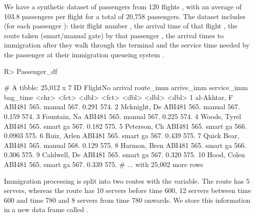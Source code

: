 \documentclass[article]{jss}
\begin{document}
We have a synthetic dataset of passengers  from 120 flights
, with an average of 103.8 passengers per flight for a
total of 20,758 passengers. The dataset includes (for each passenger
): their flight number , the arrival time of
that flight , the route taken (smart/manual gate) by that
passenger , the arrival times to immigration after
they walk through the terminal  and the service time
needed by the passenger at their immigration queueing system
.
%
\begin{CodeChunk}
\begin{Sinput}
R> Passenger_df
\end{Sinput}
\begin{Soutput}
# A tibble: 25,012 x 7
   ID            FlightNo arrival route_imm arrive_imm service_imm bag_time
   <chr>         <fct>      <dbl> <fct>          <dbl>       <dbl>    <dbl>
 1 al-Akhtar, F  ABI481      565. manual          567.      0.291      574.
 2 Mcknight, De  ABI481      565. manual          567.      0.159      574.
 3 Fountain, Na  ABI481      565. manual          567.      0.225      574.
 4 Woods, Tyrel  ABI481      565. smart ga        567.      0.182      575.
 5 Peterson, Ch  ABI481      565. smart ga        566.      0.0903     575.
 6 Ruiz, Arlen   ABI481      565. smart ga        567.      0.439      575.
 7 Quick Bear,   ABI481      565. manual          568.      0.129      575.
 8 Harmon, Bren  ABI481      565. smart ga        566.      0.306      575.
 9 Caldwell, De  ABI481      565. smart ga        567.      0.320      575.
10 Hood, Colen   ABI481      565. smart ga        567.      0.339      575.
# ... with 25,002 more rows
\end{Soutput}
\end{CodeChunk}
%
Immigration processing is split into two routes with the
 variable. The  route has 5
servers, whereas the  route has 10 servers before time
600, 12 servers between time 600 and time 780 and 8 servers from time
780 onwards. We store this information in a new data frame
called .
%
\begin{CodeChunk}
\end{CodeChunk}
\end{document}
